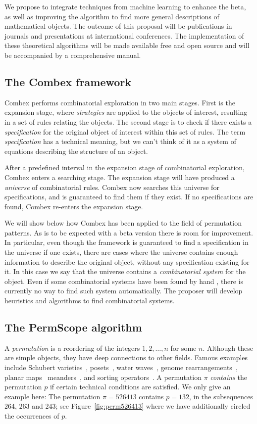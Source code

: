 \documentclass{rannis}
\newcommand{\motheralg}{\textsf{Combex}}
\newcommand{\tilealg}{\textsf{PermScope}}
\theoremstyle{definition}
\begin{document}
We propose to integrate techniques from machine learning to enhance the beta,
as well as improving the algorithm to find more general descriptions
of mathematical objects.
The outcome of this proposal will be
publications in journals and presentations at international
conferences. The implementation of
these theoretical algorithms will be made available free and open source and
will be accompanied by a comprehensive manual.
\subsection*{The \motheralg{} framework}

\motheralg{} performs combinatorial
exploration in two main stages. First is the expansion stage, where \emph{strategies} are
applied to the objects of interest, resulting in a set of rules
relating the objects. The second stage is to check if there exists
a \emph{specification} for the original object of interest
within this set of rules. The term \emph{specification} has a technical meaning,
but we can't think of it as a system of equations describing the structure of an object.

After a predefined interval in the expansion stage of combinatorial exploration, \motheralg{} enters a searching stage. The expansion stage will have produced a \textit{universe} of combinatorial rules. \motheralg{} now searches this universe for specifications, and is guaranteed to find them if they exist. If no specifications are found, \motheralg{} re-enters the expansion stage.

We will show below how \motheralg{} has been applied to the field of permutation
patterns.
As is to be expected with a beta version there is room for improvement. In
particular, even though the
framework is guaranteed to find a specification in the universe if
one exists, there are cases where the universe contains enough information to
describe the original object, without any specification existing for it.
In this case we say that the universe contains a \emph{combinatorial system} for
the object.
Even if some combinatorial systems have been found by hand \cite{BeanPhd},
there is currently no way to find such system automatically.
The proposer will develop heuristics and algorithms to find combinatorial systems.

\subsection*{The \tilealg{} algorithm}
A \emph{permutation} is a reordering of the integers $1, 2, \dotsc, n$
for some $n$. Although
these are simple objects, they have deep connections to other fields. Famous
examples include Schubert varieties~\cite{MR1051089}, posets~\cite{MR2652101},
water waves~\cite{MR2813307}, genome rearrangements~\cite{MR2518996}, planar maps~\cite{CKS09}
meanders~\cite{fukuda:042202}, and sorting operators~\cite{MR0445948}.
A permutation $\pi$ \emph{contains} the permutation $p$ if certain technical
conditions are satisfied. We only give an example here: The permutation $\pi = 526413$
contains $p = 132$,  in the subsequences $264$, $263$ and $243$; see
Figure~\ref{fig:perm526413} where we have additionally circled the occurrences of $p$.
\end{document}
